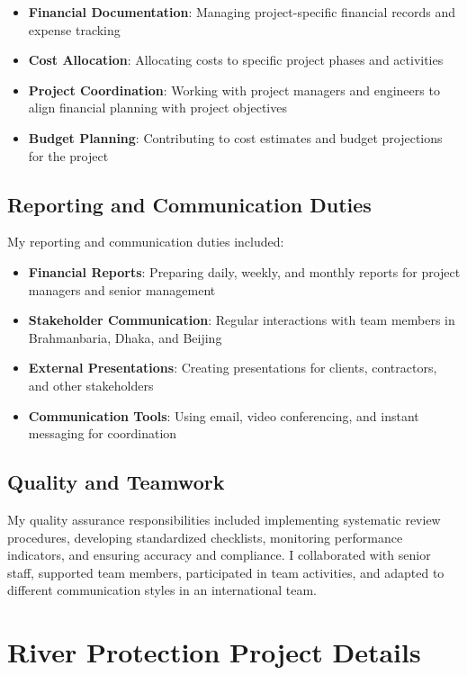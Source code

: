 \begin{itemize}[leftmargin=*, itemsep=0.25em]
    \item \textbf{Financial Documentation}: Managing project-specific financial records and expense tracking
    \item \textbf{Cost Allocation}: Allocating costs to specific project phases and activities
    \item \textbf{Project Coordination}: Working with project managers and engineers to align financial planning with project objectives
    \item \textbf{Budget Planning}: Contributing to cost estimates and budget projections for the project
\end{itemize}

\subsection{Reporting and Communication Duties}
My reporting and communication duties included:

\begin{itemize}[leftmargin=*, itemsep=0.25em]
    \item \textbf{Financial Reports}: Preparing daily, weekly, and monthly reports for project managers and senior management
    \item \textbf{Stakeholder Communication}: Regular interactions with team members in Brahmanbaria, Dhaka, and Beijing
    \item \textbf{External Presentations}: Creating presentations for clients, contractors, and other stakeholders
    \item \textbf{Communication Tools}: Using email, video conferencing, and instant messaging for coordination
\end{itemize}

\subsection{Quality and Teamwork}
My quality assurance responsibilities included implementing systematic review procedures, developing standardized checklists, monitoring performance indicators, and ensuring accuracy and compliance. I collaborated with senior staff, supported team members, participated in team activities, and adapted to different communication styles in an international team.

\vspace{0.5em}
\section{River Protection Project Details}

